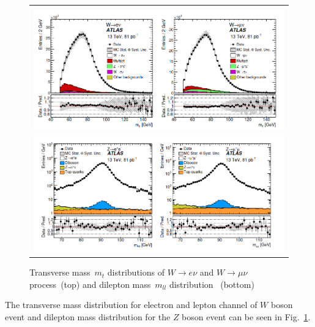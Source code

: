 \begin{figure}[h!]
\centering
\begin{tabular}{c}
\includegraphics[scale=0.45]{chapter3/mt.png}\\

\includegraphics[scale=0.45]{chapter3/mll.png}
\end{tabular}
\caption{Transverse mass~$m_{t}$ distributions of $W\rightarrow e\nu$ and $W\rightarrow \mu\nu$ process~(top) and dilepton mass~$m_{ll}$ distribution~ (bottom)~\cite{Aad_2016}}
\label{mt_mll}
\end{figure}

The transverse mass distribution for electron and lepton channel of $W$ boson event and dilepton mass distribution for the $Z$ boson event can be seen in Fig.~\ref{mt_mll}. 
